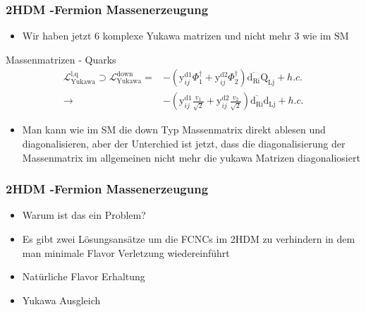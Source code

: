 \documentclass[xcolor=dvipsnames]{beamer}
\begin{document}
\begin{frame}
\frametitle{2HDM -Fermion Massenerzeugung}
\begin{itemize}
\item Wir haben jetzt 6 komplexe Yukawa matrizen und nicht mehr 3 wie im SM 
\end{itemize}
\begin{block}{Massenmatrizen - Quarks }
\begin{equation*}
\begin{split}
\mathscr{L}_{\text{Yukawa}}^{\text{l,q}}\supset \mathscr{L}_{\text{Yukawa}}^{\text{down}} =&-(\text{y}^{\text{d1}}_{ij}\Phi_{1}^{\dagger}+\text{y}^{\text{d2}}_{ij}\Phi_{2}^{\dagger})\overline{\text{d}_{\text{Ri}}}\text{Q}_{\text{Lj}} +h.c. \\
\rightarrow &-(\text{y}^{\text{d1}}_{ij}\frac{v_{1}}{\sqrt{2}}+\text{y}^{\text{d2}}_{ij}\frac{v_{2}}{\sqrt{2}})\overline{\text{d}_{\text{Ri}}}\text{d}_{\text{Lj}} +h.c. 
\end{split}
\end{equation*}
\end{block}

\begin{itemize}
\item Man kann wie im SM die down Typ Massenmatrix direkt ablesen und diagonalisieren, aber der Unterchied ist jetzt, dass die diagonalisierung der Massenmatrix  im allgemeinen nicht mehr die yukawa Matrizen diagonaliosiert 
\end{itemize}
\end{frame}
\begin{frame}[t]
\frametitle{2HDM -Fermion Massenerzeugung}
\begin{itemize}

\item Warum ist das ein Problem?



\item Es gibt zwei Lösungsansätze um die FCNCs im 2HDM zu verhindern in dem man minimale Flavor Verletzung wiedereinführt
\item Natürliche Flavor Erhaltung
\item Yukawa Ausgleich 
\end{itemize}

\end{frame}
\end{document}
